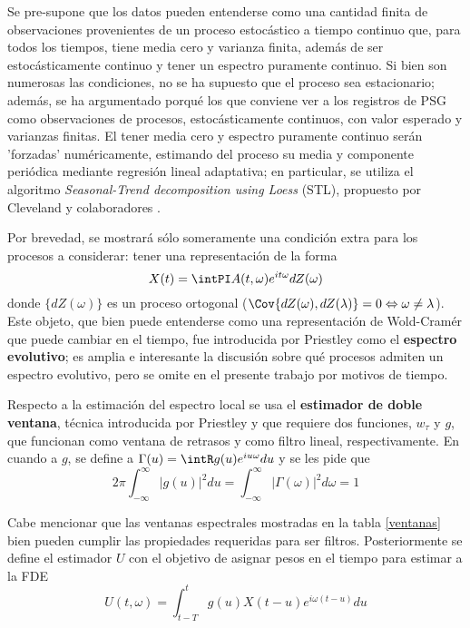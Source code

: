 Se pre-supone que los datos pueden entenderse como una cantidad finita de 
observaciones provenientes de un proceso estoc\'astico a tiempo continuo que, para todos los 
tiempos, tiene media cero y varianza finita, adem\'as de ser estoc\'asticamente continuo y tener 
un espectro puramente continuo.
Si bien son numerosas las condiciones, no se ha supuesto que
el proceso sea estacionario; adem\'as, se ha argumentado porqu\'e los que conviene ver a los 
registros de PSG  como observaciones de procesos, estoc\'asticamente continuos, con valor 
esperado y varianzas finitas. El tener media cero y espectro puramente continuo ser\'an 'forzadas' 
num\'ericamente, estimando del proceso su media y componente peri\'odica mediante regresi\'on
lineal adaptativa; en particular, se utiliza el algoritmo \textit{Seasonal-Trend decomposition
using Loess} (STL), propuesto por Cleveland y colaboradores \cite{Cleveland1990}.

Por brevedad, se mostrar\'a s\'olo someramente una condici\'on extra para los procesos a considerar:
tener una representaci\'on de la forma
\begin{equation*}
X(t) = \intPI A(t,\omega) e^{i t \omega} dZ(\omega)
\end{equation*}
donde $\{ dZ(\omega) \}$ es un proceso ortogonal 
($\Cov{dZ(\omega),dZ(\lambda)} = 0 \Leftrightarrow \omega \neq \lambda$).
Este objeto, que bien puede entenderse como una representaci\'on de Wold-Cram\'er que puede cambiar
en el tiempo, fue introducida por Priestley \cite{Priestley65} como el
\textbf{espectro evolutivo}; es amplia e interesante
la discusi\'on sobre qu\'e procesos admiten un espectro evolutivo, pero se omite en
el presente trabajo por motivos de tiempo.

Respecto a la estimaci\'on del espectro local se usa el \textbf{estimador de doble ventana}, 
t\'ecnica introducida por Priestley \cite{Priestley69} y que requiere dos funciones, $w_\tau$ y 
$g$, que funcionan como ventana de retrasos y como filtro lineal, respectivamente.
%
En cuando a $g$, se define a $\Gamma(u) = \intR g(u) e^{i u \omega} du$ y se les pide que
\begin{equation*}
2\pi \int_{-\infty}^{\infty} \lvert g(u) \lvert^{2} du 
= 
\int_{-\infty}^{\infty} \lvert \Gamma(\omega) \lvert^{2} d\omega
= 1
\end{equation*}

Cabe mencionar que las ventanas espectrales mostradas en la tabla \ref{ventanas} bien 
pueden cumplir las propiedades requeridas para ser filtros.
Posteriormente se define el estimador $U$ con el objetivo de asignar pesos en el tiempo para estimar
a la FDE
\begin{equation*}
U(t,\omega) = \int_{t-T}^{t} g(u) X({t-u}) e^{i \omega (t-u)} du
\end{equation*}

